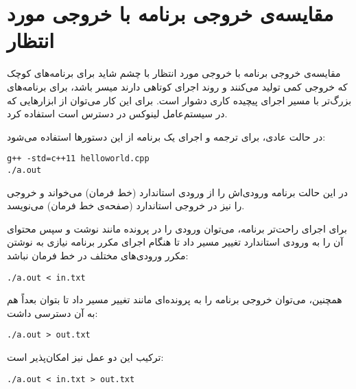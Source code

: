\documentclass{utsignal}
\begin{document}
    \appendix

    \section{مقایسه‌ی خروجی برنامه با خروجی مورد انتظار\label{sec:diff}}

    مقایسه‌ی خروجی برنامه با خروجی مورد انتظار با چشم شاید برای برنامه‌های کوچک که خروجی کمی تولید می‌کنند و روند اجرای کوتاهی دارند میسر باشد، برای برنامه‌های بزرگ‌تر با مسیر اجرای پیچیده کاری دشوار است. برای این کار می‌توان از ابزارهایی که در سیستم‌عامل لینوکس در دسترس است استفاده کرد.

    در حالت عادی، برای ترجمه و اجرای یک برنامه از این دستورها استفاده می‌شود:
    \begin{latin}%
    \begin{Verbatim}[fontsize=\small]
g++ -std=c++11 helloworld.cpp
./a.out
    \end{Verbatim}
    \end{latin}

    در این حالت برنامه ورودی‌اش را از ورودی استاندارد  (خط فرمان) می‌خواند و خروجی را نیز در خروجی استاندارد  (صفحه‌ی خط فرمان) می‌نویسد.

    برای اجرای راحت‌تر برنامه، می‌توان ورودی را در پرونده مانند  نوشت و سپس محتوای آن را به ورودی استاندارد تغییر مسیر داد تا هنگام اجرای مکرر برنامه نیازی به نوشتن مکرر ورودی‌های مختلف در خط فرمان نباشد:
    \begin{latin}%
    \begin{Verbatim}[fontsize=\small]
./a.out < in.txt
    \end{Verbatim}
    \end{latin}

    همچنین، می‌توان خروجی برنامه را به پرونده‌ای مانند  تغییر مسیر داد تا بتوان بعداً هم به آن دسترسی داشت:
    \begin{latin}%
    \begin{Verbatim}[fontsize=\small]
./a.out > out.txt
    \end{Verbatim}
    \end{latin}

    ترکیب این دو عمل نیز امکان‌پذیر است:
    \begin{latin}%
    \begin{Verbatim}[fontsize=\small]
./a.out < in.txt > out.txt
    \end{Verbatim}
    \end{latin}
\end{document}
